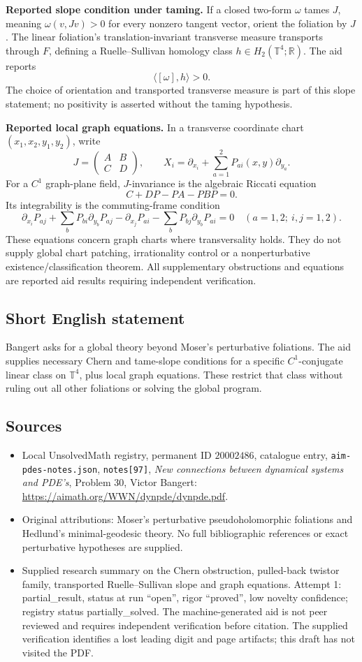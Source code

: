 \documentclass[11pt]{article}
\newcommand{\R}{\mathbb{R}}
\newcommand{\C}{\mathbb{C}}
\begin{document}
\textbf{Reported slope condition under taming.} If a closed two-form \(\omega\) tames \(J\), meaning \(\omega(v,Jv)>0\) for every nonzero tangent vector, orient the foliation by \(J\). The linear foliation's translation-invariant transverse measure transports through \(F\), defining a Ruelle--Sullivan homology class \(h\in H_2(\mathbb T^4;\R)\). The aid reports
\[
 \langle[\omega],h\rangle>0.
\]
The choice of orientation and transported transverse measure is part of this slope statement; no positivity is asserted without the taming hypothesis.

\textbf{Reported local graph equations.} In a transverse coordinate chart \((x_1,x_2,y_1,y_2)\), write
\[
 J=\begin{pmatrix}A&B\\C&D\end{pmatrix},\qquad
 X_i=\partial_{x_i}+\sum_{a=1}^2P_{ai}(x,y)\partial_{y_a}.
\]
For a \(C^1\) graph-plane field, \(J\)-invariance is the algebraic Riccati equation
\[
 C+DP-PA-PBP=0.
\]
Its integrability is the commuting-frame condition
\[
 \partial_{x_i}P_{aj}+\sum_bP_{bi}\partial_{y_b}P_{aj}
 -\partial_{x_j}P_{ai}-\sum_bP_{bj}\partial_{y_b}P_{ai}=0
 \quad(a=1,2;\ i,j=1,2).
\]
These equations concern graph charts where transversality holds. They do not supply global chart patching, irrationality control or a nonperturbative existence/classification theorem. All supplementary obstructions and equations are reported aid results requiring independent verification.
\subsection{Short English statement}
Bangert asks for a global theory beyond Moser's perturbative foliations. The aid supplies necessary Chern and tame-slope conditions for a specific \(C^1\)-conjugate linear class on \(\mathbb T^4\), plus local graph equations. These restrict that class without ruling out all other foliations or solving the global program.
\subsection{Sources}
\begin{itemize}
\item Local UnsolvedMath registry, permanent ID \(20002486\), catalogue entry, \texttt{aim-pdes-notes.json}, \texttt{notes[97]}, \emph{New connections between dynamical systems and PDE's}, Problem 30, Victor Bangert: \url{https://aimath.org/WWN/dynpde/dynpde.pdf}.
\item Original attributions: Moser's perturbative pseudoholomorphic foliations and Hedlund's minimal-geodesic theory. No full bibliographic references or exact perturbative hypotheses are supplied.
\item Supplied research summary on the Chern obstruction, pulled-back twistor family, transported Ruelle--Sullivan slope and graph equations. Attempt 1: partial\_result, status at run ``open'', rigor ``proved'', low novelty confidence; registry status partially\_solved. The machine-generated aid is not peer reviewed and requires independent verification before citation. The supplied verification identifies a lost leading digit and page artifacts; this draft has not visited the PDF.
\end{itemize}
\end{document}
